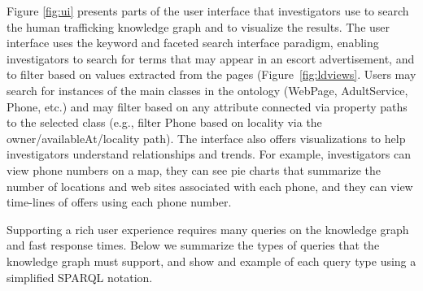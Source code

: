 Figure \ref{fig:ui} presents parts of the user interface that investigators use to search the human trafficking knowledge graph and to visualize the results.
The user interface uses the keyword and faceted search interface paradigm, enabling investigators to search for terms that may appear in an escort advertisement, and to filter based on values extracted from the pages (Figure~\ref{fig:ldviews}.
Users may search for instances of the main classes in the ontology (WebPage, AdultService, Phone, etc.) and may filter based on any attribute connected via property paths to the selected class (e.g., filter Phone based on locality via the owner/availableAt/locality path).
The interface also offers visualizations to help investigators understand relationships and trends.
For example, investigators can view phone numbers on a map, they can see pie charts that summarize the number of locations and web sites associated with each phone, and they can view time-lines of offers using each phone number.

Supporting a rich user experience requires many queries on the knowledge graph and fast response times.
Below we summarize the types of queries that the knowledge graph must support, and show and example of each query type using a simplified SPARQL notation.